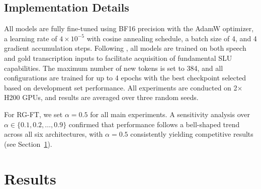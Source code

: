 \documentclass[cameraready]{Interspeech}
\begin{document}
\subsection{Implementation Details}
All models are fully fine-tuned using BF16 precision with the AdamW
optimizer, a learning rate of $4 \times 10^{-5}$ with cosine annealing
schedule, a batch size of 4, and 4 gradient accumulation steps.
Following \cite{choi2025exploring}, all models are trained on both
speech and gold transcription inputs to facilitate acquisition of
fundamental SLU capabilities.
The maximum number of new tokens is set to 384, and all configurations
are trained for up to 4 epochs with the best checkpoint selected based
on development set performance. All experiments are conducted on
2$\times$H200 GPUs, and results are averaged over three random seeds.

For RG-FT, we set $\alpha{=}0.5$ for all main experiments. A
sensitivity analysis over $\alpha \in \{0.1, 0.2, \ldots, 0.9\}$
confirmed that performance follows a bell-shaped trend across all six
architectures, with $\alpha{=}0.5$ consistently yielding competitive
results (see Section~\ref{sec:results}).

\begin{table}[t]
\centering
\caption{Latent space separability metrics for Qwen2.5-Omni-7B comparing Direct-FT and RG-FT. All metrics quantify the degree of inter-class separability; higher values indicate greater separation.}
\label{tab:rep_analysis}
\end{table}



\section{Results}
\label{sec:results}
\end{document}
